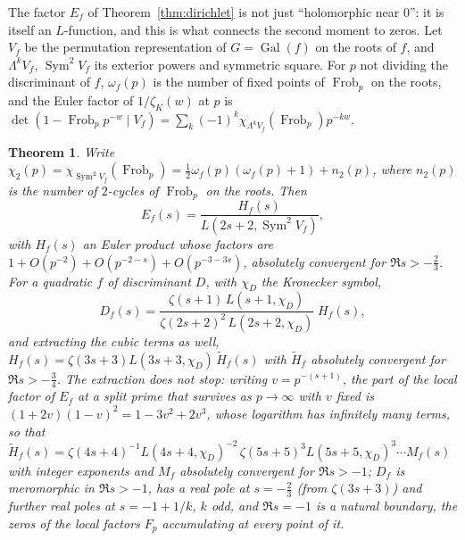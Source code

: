 \documentclass[11pt,a4paper]{article}
\newtheorem{theorem}{Theorem}
\theoremstyle{remark}\newtheorem{remark}[theorem]{Remark}
\begin{document}
The factor $E_f$ of Theorem~\ref{thm:dirichlet} is not just ``holomorphic near $0$'': it is itself an
$L$-function, and this is what connects the second moment to zeros. Let $V_f$ be the permutation
representation of $G=\operatorname{Gal}(f)$ on the roots of $f$, and $\Lambda^kV_f$, $\operatorname{Sym}^2V_f$ its
exterior powers and symmetric square. For $p$ not dividing the discriminant of $f$, $\omega_f(p)$ is the
number of fixed points of $\operatorname{Frob}_p$ on the roots, and the Euler factor of $1/\zeta_K(w)$ at $p$ is
$\det(1-\operatorname{Frob}_pp^{-w}\mid V_f)=\sum_k(-1)^k\chi_{\Lambda^kV_f}(\operatorname{Frob}_p)p^{-kw}$.

\begin{theorem}\label{thm:artin}
Write $\chi_2(p)=\chi_{\operatorname{Sym}^2V_f}(\operatorname{Frob}_p)=\tfrac12\omega_f(p)(\omega_f(p)+1)+n_2(p)$, where
$n_2(p)$ is the number of $2$-cycles of $\operatorname{Frob}_p$ on the roots. Then
\[
E_f(s)=\frac{H_f(s)}{L(2s+2,\operatorname{Sym}^2V_f)},
\]
with $H_f(s)$ an Euler product whose factors are $1+O(p^{-2})+O(p^{-2-s})+O(p^{-3-3s})$, absolutely
convergent for $\Re s>-\tfrac23$. For a quadratic $f$ of discriminant $D$, with $\chi_D$ the Kronecker
symbol,
\[
D_f(s)=\frac{\zeta(s+1)\,L(s+1,\chi_D)}{\zeta(2s+2)^2\,L(2s+2,\chi_D)}\;H_f(s),
\]
and extracting the cubic terms as well, $H_f(s)=\zeta(3s+3)L(3s+3,\chi_D)\,\tilde H_f(s)$ with $\tilde H_f$
absolutely convergent for $\Re s>-\tfrac34$. The extraction does not stop: writing $v=p^{-(s+1)}$, the
part of the local factor of $E_f$ at a split prime that survives as $p\to\infty$ with $v$ fixed is
$(1+2v)(1-v)^2=1-3v^2+2v^3$, whose logarithm has infinitely many terms, so that
$\tilde H_f(s)=\zeta(4s+4)^{-1}L(4s+4,\chi_D)^{-2}\,\zeta(5s+5)^3L(5s+5,\chi_D)^3\cdots M_f(s)$ with integer
exponents and $M_f$ absolutely convergent for $\Re s>-1$; $D_f$ is meromorphic in $\Re s>-1$, has a real
pole at $s=-\tfrac23$ (from $\zeta(3s+3)$) and further real poles at $s=-1+1/k$, $k$ odd, and $\Re s=-1$ is
a natural boundary, the zeros of the local factors $F_p$ accumulating at every point of it.
\end{theorem}
\end{document}

